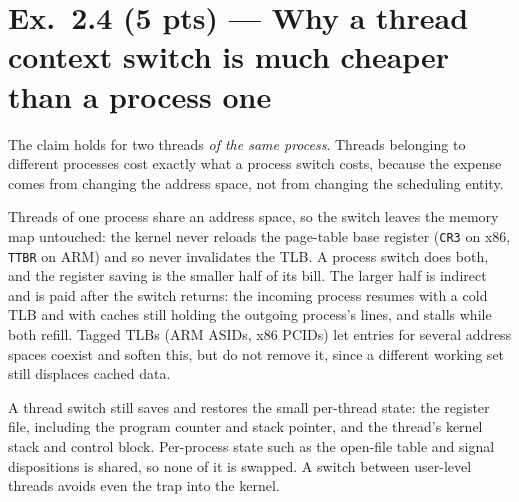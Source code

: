 \section*{Ex.~2.4 (5 pts) --- Why a thread context switch is much cheaper than a process one}

The claim holds for two threads \emph{of the same process}. Threads belonging to
different processes cost exactly what a process switch costs, because the expense
comes from changing the address space, not from changing the scheduling entity.

Threads of one process share an address space, so the switch leaves the memory map
untouched: the kernel never reloads the page-table base register (\texttt{CR3} on
x86, \texttt{TTBR} on ARM) and so never invalidates the TLB. A process switch does
both, and the register saving is the smaller half of its bill. The larger half is
indirect and is paid after the switch returns: the incoming process resumes with a
cold TLB and with caches still holding the outgoing process's lines, and stalls
while both refill. Tagged TLBs (ARM ASIDs, x86 PCIDs) let entries for several
address spaces coexist and soften this, but do not remove it, since a different
working set still displaces cached data.

A thread switch still saves and restores the small per-thread state: the register
file, including the program counter and stack pointer, and the thread's kernel
stack and control block. Per-process state such as the open-file table and signal
dispositions is shared, so none of it is swapped. A switch between user-level
threads avoids even the trap into the kernel.
